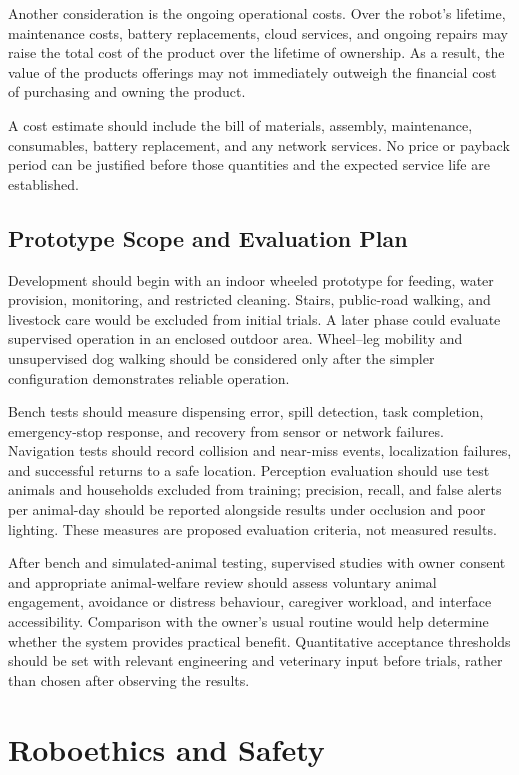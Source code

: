 \documentclass[conference,letterpaper]{IEEEtran}
\begin{document}
Another consideration is the ongoing operational costs. Over the robot’s lifetime, maintenance costs, battery replacements, cloud services, and ongoing repairs may raise the total cost of the product over the lifetime of ownership. As a result, the value of the products offerings may not immediately outweigh the financial cost of purchasing and owning the product.

A cost estimate should include the bill of materials, assembly, maintenance, consumables, battery replacement, and any network services. No price or payback period can be justified before those quantities and the expected service life are established.

\subsection{Prototype Scope and Evaluation Plan}

Development should begin with an indoor wheeled prototype for feeding, water provision, monitoring, and restricted cleaning. Stairs, public-road walking, and livestock care would be excluded from initial trials. A later phase could evaluate supervised operation in an enclosed outdoor area. Wheel--leg mobility and unsupervised dog walking should be considered only after the simpler configuration demonstrates reliable operation.

Bench tests should measure dispensing error, spill detection, task completion, emergency-stop response, and recovery from sensor or network failures. Navigation tests should record collision and near-miss events, localization failures, and successful returns to a safe location. Perception evaluation should use test animals and households excluded from training; precision, recall, and false alerts per animal-day should be reported alongside results under occlusion and poor lighting. These measures are proposed evaluation criteria, not measured results.

After bench and simulated-animal testing, supervised studies with owner consent and appropriate animal-welfare review should assess voluntary animal engagement, avoidance or distress behaviour, caregiver workload, and interface accessibility. Comparison with the owner's usual routine would help determine whether the system provides practical benefit. Quantitative acceptance thresholds should be set with relevant engineering and veterinary input before trials, rather than chosen after observing the results.

\section{Roboethics and Safety}
\end{document}
